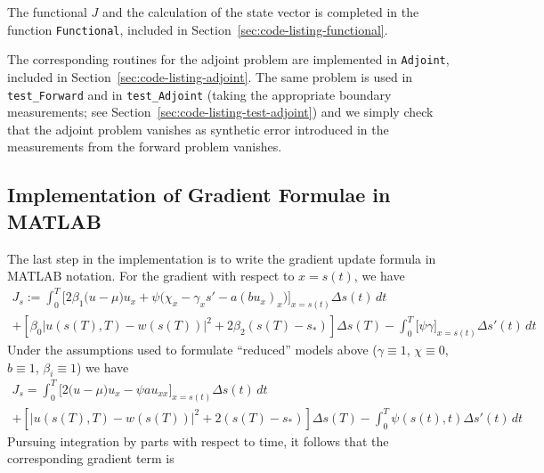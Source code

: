 \documentclass[letterpaper, 10pt, draft]{amsart}
\theoremstyle{definition}
\theoremstyle{remark}
\newcommand{\lnorm}[1]{\left\vert #1\right\vert}%
\begin{document}
The functional $J$ and the calculation of the state vector is completed in the
function \verb+Functional+, included in Section~\ref{sec:code-listing-functional}.

The corresponding routines for the adjoint problem are implemented in \verb+Adjoint+, included in Section~\ref{sec:code-listing-adjoint}.
The same problem is used in \verb+test_Forward+ and in \verb+test_Adjoint+
(taking the appropriate boundary measurements; see
Section~\ref{sec:code-listing-test-adjoint}) and we simply check that the
adjoint problem vanishes as synthetic error introduced in the measurements from
the forward problem vanishes.

\subsection{Implementation of Gradient Formulae in MATLAB}
The last step in the implementation is to write the gradient update formula in MATLAB notation.
For the gradient with respect to $x=s(t)$, we have
\begin{gather*}
  J_{s}
  := \int_0^T \Big[2\beta_1\big(u - \mu\big)u_x + \psi \big(\chi_x - \gamma_x s'  - a (b u_x)_x \big)\Big]_{x=s(t)} {\Delta s}(t)\,dt \nonumber
  \\
  +
  \left[\beta_0\lnorm{u(s(T),T) - w(s(T))}^2 + 2 \beta_2 (s(T) - s_*)\right] {\Delta s}(T) 
  - \int_0^T \big[\psi \gamma\big]_{x=s(t)} {\Delta s}'(t) \,dt
\end{gather*}
Under the assumptions used to formulate ``reduced'' models above ($\gamma \equiv
1$, $\chi \equiv 0$, $b\equiv 1$, $\beta_i \equiv 1$) we have
\begin{gather*}
  J_{s}
  = \int_0^T \Big[2\big(u - \mu\big)u_x - \psi  a u_{xx} \Big]_{x=s(t)} {\Delta s}(t)\,dt \nonumber
  \\
  +
  \left[\lnorm{u(s(T),T) - w(s(T))}^2 + 2 (s(T) - s_*)\right] {\Delta s}(T) 
  - \int_0^T \psi(s(t),t) {\Delta s}'(t) \,dt
\end{gather*}
Pursuing integration by parts with respect to time, it follows that the corresponding gradient term is
\end{document}
